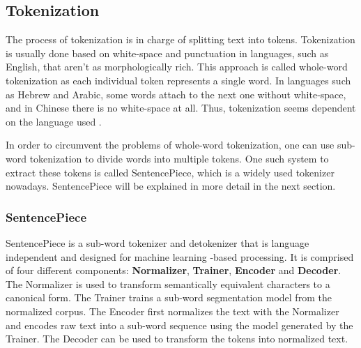 \subsection{Tokenization} \label{Tokenization}
The process of tokenization is in charge of splitting text into tokens.
Tokenization is usually done based on white-space and punctuation in languages, such as English, that aren't as morphologically rich.
This approach is called whole-word tokenization as each individual token represents a single word.
In languages such as Hebrew and Arabic, some words attach to the next one without white-space, and in Chinese there is no white-space at all.
Thus, tokenization seems dependent on the language used \cite{goldberg2017}.

In order to circumvent the problems of whole-word tokenization, one can use sub-word tokenization to divide words into multiple tokens.
One such system to extract these tokens is called SentencePiece, which is a widely used tokenizer nowadays.
SentencePiece will be explained in more detail in the next section.





\subsubsection{SentencePiece} \label{SentencePiece}

SentencePiece is a sub-word tokenizer and detokenizer that is language independent and designed for machine learning -based processing.
It is comprised of four different components: \textbf{Normalizer}, \textbf{Trainer}, \textbf{Encoder} and \textbf{Decoder}.
The Normalizer is used to transform semantically equivalent characters to a canonical form.
The Trainer trains a sub-word segmentation model from the normalized corpus.
The Encoder first normalizes the text with the Normalizer and encodes raw text into a sub-word sequence using the model generated by the Trainer.
The Decoder can be used to transform the tokens into normalized text. \cite{kudo2018}

